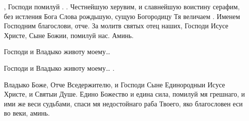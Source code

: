 \begin{mymulticols}
, Господи помилуй . . Честнейшую херувим, и славнейшую воистину серафим, без истления Бога Слова рождьшую, сущую Богородицу Тя величаем . Именем Господним благослови, отче. За молитв святых отец наших, Господи Исусе Христе, Сыне Божии, помилуй нас. Аминь.


 Господи и Владыко животу моему… 

 Господи и Владыко животу моему… . 

 Владыко Боже, Отче Вседержителю, и Господи Сыне Единородныи Исусе Христе, и Святыи Душе. Едино Божество и едина сила, помилуй мя грешнаго, и ими же веси судьбами, спаси мя недостойнаго раба Твоего, яко благословен еси во веки, аминь.


\end{mymulticols}

